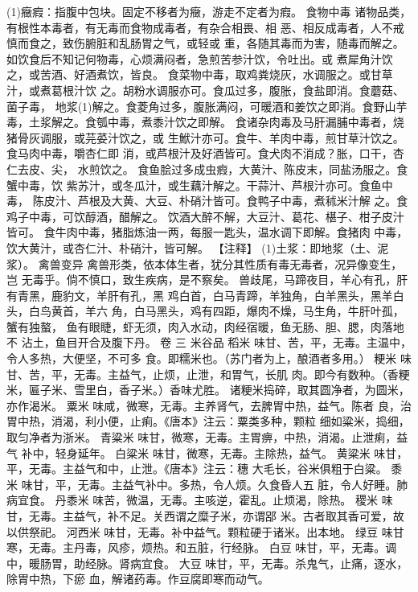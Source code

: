 \documentclass[12pt,UTF8]{ctexbook}
\begin{document}
(1)癥瘕：指腹中包块。固定不移者为癥，游走不定者为瘕。
食物中毒
诸物品类，有根性本毒者，有无毒而食物成毒者，有杂合相畏、相
恶、相反成毒者，人不戒慎而食之，致伤腑脏和乱肠胃之气，或轻或
重，各随其毒而为害，随毒而解之。
如饮食后不知记何物毒，心烦满闷者，急煎苦参汁饮，令吐出。或
煮犀角汁饮之，或苦酒、好酒煮饮，皆良。
食菜物中毒，取鸡粪烧灰，水调服之。或甘草汁，或煮葛根汁饮
之。胡粉水调服亦可。食瓜过多，腹胀，食盐即消。食蘑菇、菌子毒，
地浆(1)解之。食菱角过多，腹胀满闷，可暖酒和姜饮之即消。食野山芋
毒，土浆解之。食瓠中毒，煮黍汁饮之即解。
食诸杂肉毒及马肝漏脯中毒者，烧猪骨灰调服，或芫荽汁饮之，或
生鮲汁亦可。食牛、羊肉中毒，煎甘草汁饮之。食马肉中毒，嚼杏仁即
消，或芦根汁及好酒皆可。食犬肉不消成？胀，口干，杏仁去皮、尖，
水煎饮之。
食鱼脍过多成虫瘕，大黄汁、陈皮末，同盐汤服之。食蟹中毒，饮
紫苏汁，或冬瓜汁，或生藕汁解之。干蒜汁、芦根汁亦可。食鱼中毒，
陈皮汁、芦根及大黄、大豆、朴硝汁皆可。食鸭子中毒，煮秫米汁解
之。食鸡子中毒，可饮醇酒，醋解之。
饮酒大醉不解，大豆汁、葛花、椹子、柑子皮汁皆可。
食牛肉中毒，猪脂炼油一两，每服一匙头，温水调下即解。食猪肉
中毒，饮大黄汁，或杏仁汁、朴硝汁，皆可解。
【注释】
(1)土浆：即地浆（土、泥浆）。
禽兽变异
禽兽形类，依本体生者，犹分其性质有毒无毒者，况异像变生，岂
无毒乎。倘不慎口，致生疾病，是不察矣。
兽歧尾，马蹄夜目，羊心有孔，肝有青黑，鹿豹文，羊肝有孔，黑
鸡白首，白马青蹄，羊独角，白羊黑头，黑羊白头，白鸟黄首，羊六
角，白马黑头，鸡有四距，爆肉不燥，马生角，牛肝叶孤，蟹有独螯，
鱼有眼睫，虾无须，肉入水动，肉经宿暖，鱼无肠、胆、腮，肉落地不
沾土，鱼目开合及腹下丹。
卷 三
米谷品
稻米 味甘、苦，平，无毒。主温中，令人多热，大便坚，不可多
食。即糯米也。（苏门者为上，酿酒者多用。）
粳米 味甘、苦，平，无毒。主益气，止烦，止泄，和胃气，长肌
肉。即今有数种。（香粳米，匾子米、雪里白，香子米。）香味尤胜。
诸粳米捣碎，取其圆净者，为圆米，亦作渴米。
粟米 味咸，微寒，无毒。主养肾气，去脾胃中热，益气。陈者
良，治胃中热，消渴，利小便，止痢。《唐本》注云：粟类多种，颗粒
细如粱米，捣细，取匀净者为浙米。
青粱米 味甘，微寒，无毒。主胃痹，中热，消渴。止泄痢，益气
补中，轻身延年。
白粱米 味甘，微寒，无毒。主除热，益气。
黄粱米 味甘，平，无毒。主益气和中，止泄。《唐本》注云：穗
大毛长，谷米俱粗于白粱。
黍米 味甘，平，无毒。主益气补中。多热，令人烦。久食昏人五
脏，令人好睡。肺病宜食。
丹黍米 味苦，微温，无毒。主咳逆，霍乱。止烦渴，除热。
稷米 味甘，无毒。主益气，补不足。关西谓之糜子米，亦谓郘
米。古者取其香可爱，故以供祭祀。
河西米 味甘，无毒。补中益气。颗粒硬于诸米。出本地。
绿豆 味甘寒，无毒。主丹毒，风疹，烦热。和五脏，行经脉。
白豆 味甘，平，无毒。调中，暖肠胃，助经脉。肾病宜食。
大豆 味甘，平，无毒。杀鬼气，止痛，逐水，除胃中热，下瘀
血，解诸药毒。作豆腐即寒而动气。
\end{document}
